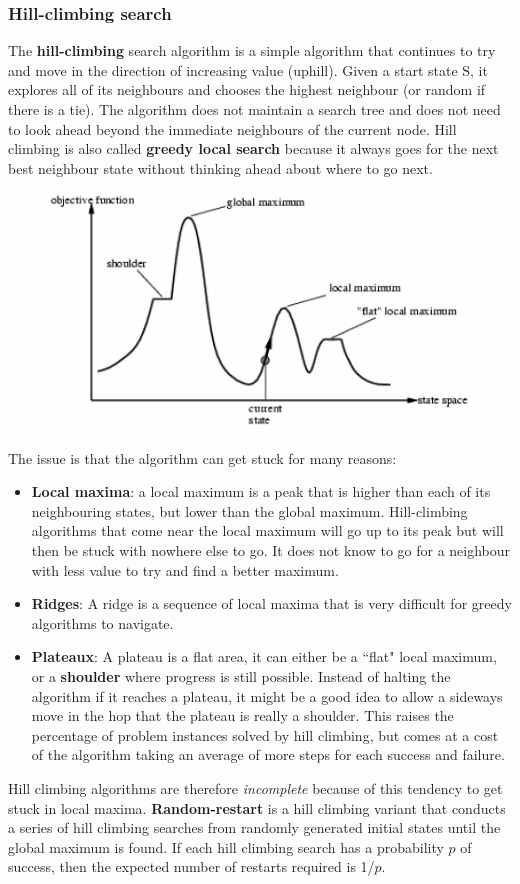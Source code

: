 \documentclass{article}
\begin{document}
\subsubsection{Hill-climbing search}
The \textbf{hill-climbing} search algorithm is a simple algorithm that continues to try and move in the direction of increasing value (uphill). Given a start state S, it explores all of its neighbours and chooses the highest neighbour (or random if there is a tie). The algorithm does not maintain a search tree and does not need to look ahead beyond the immediate neighbours of the current node. Hill climbing is also called \textbf{greedy local search} because it always goes for the next best neighbour state without thinking ahead about where to go next.
\begin{figure}[H]
\centering
\includegraphics[width=1\textwidth, keepaspectratio]{imgs/hill-climbing.png}
\end{figure}
\noindent
The issue is that the algorithm can get stuck for many reasons:
\begin{itemize}
\item \textbf{Local maxima}: a local maximum is a peak that is higher than each of its neighbouring states, but lower than the global maximum. Hill-climbing algorithms that come near the local maximum will go up to its peak but will then be stuck with nowhere else to go. It does not know to go for a neighbour with less value to try and find a better maximum. 
\item \textbf{Ridges}: A ridge is a sequence of local maxima that is very difficult for greedy algorithms to navigate.
\item \textbf{Plateaux}: A plateau is a flat area, it can either be a ``flat" local maximum, or a \textbf{shoulder} where progress is still possible. Instead of halting the algorithm if it reaches a plateau, it might be a good idea to allow a sideways move in the hop that the plateau is really a shoulder. This raises the percentage of problem instances solved by hill climbing, but comes at a cost of the algorithm taking an average of more steps for each success and failure.
\end{itemize}
Hill climbing algorithms are therefore \textit{incomplete} because of this tendency to get stuck in local maxima. \textbf{Random-restart} is a hill climbing variant that conducts a series of hill climbing searches from randomly generated initial states until the global maximum is found. If each hill climbing search has a probability $p$ of success, then the expected number of restarts required is 1/$p$.
\end{document}
